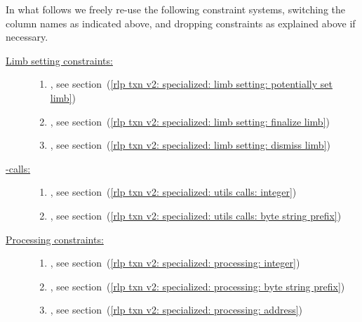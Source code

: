 In what follows we freely re-use the following constraint systems,
switching the column names as indicated above,
and dropping constraints as explained above if necessary.
\begin{description}
	\item[\underline{Limb setting constraints:}]
		\begin{enumerate}
			\item
				\setLimbName{},
				see section~(\ref{rlp txn v2: specialized: limb setting: potentially set limb})
			\item
				\conditionallySetLimbName{},
				see section~(\ref{rlp txn v2: specialized: limb setting: finalize limb})
			\item
				\discardLimbName{},
				see section~(\ref{rlp txn v2: specialized: limb setting: dismiss limb})
		\end{enumerate}
	\item[\underline{\rlpUtilsMod{}-calls:}]
		\begin{enumerate}
			\item
				\rlpUtilsInstCallByteStringPrefixName{},
				see section~(\ref{rlp txn v2: specialized: utils calls: integer})
			\item
				\rlpUtilsInstCallIntegerName{},
				see section~(\ref{rlp txn v2: specialized: utils calls: byte string prefix})
		\end{enumerate}
	\item[\underline{Processing constraints:}]
		\begin{enumerate}
			\item
				\rlpProcessIntegerName{},
				see section~(\ref{rlp txn v2: specialized: processing: integer})
			\item
				\rlpProcessByteStringName{},
				see section~(\ref{rlp txn v2: specialized: processing: byte string prefix})
			\item
				\rlpProcessAddressName{},
				see section~(\ref{rlp txn v2: specialized: processing: address})
		\end{enumerate}
\end{description}
